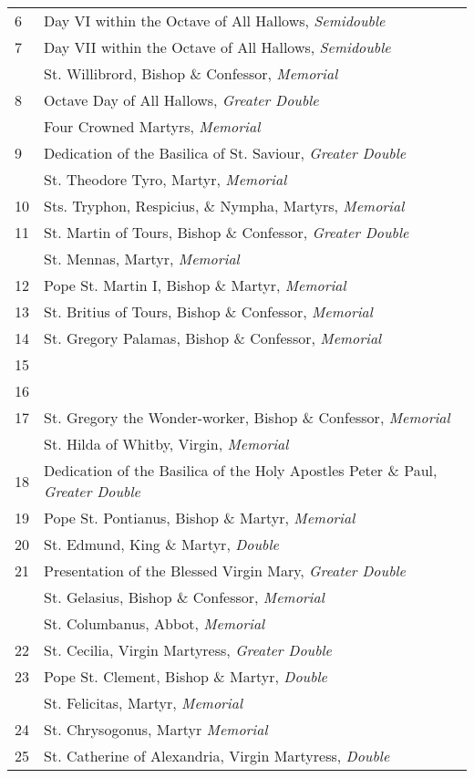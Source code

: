\begin{longtable}{p{2mm}|p{94mm}}
6&Day VI within the Octave of All Hallows, \textit{Semidouble}\\
7&Day VII within the Octave of All Hallows, \textit{Semidouble}\\
&St. Willibrord, Bishop \& Confessor, \textit{Memorial}\\
8&Octave Day of All Hallows, \textit{Greater Double}\\
&Four Crowned Martyrs, \textit{Memorial}\\
9&Dedication of the Basilica of St. Saviour, \textit{Greater Double}\\
&St. Theodore Tyro, Martyr, \textit{Memorial}\\
10&Sts. Tryphon, Respicius, \& Nympha, Martyrs, \textit{Memorial}\\
11&St. Martin of Tours, Bishop \& Confessor, \textit{Greater Double}\\
&St. Mennas, Martyr, \textit{Memorial}\\
12&Pope St. Martin I, Bishop \& Martyr, \textit{Memorial}\\
13&St. Britius of Tours, Bishop \& Confessor, \textit{Memorial}\\
14&St. Gregory Palamas, Bishop \& Confessor, \textit{Memorial}\\
15&\\
16&\\
17&St. Gregory the Wonder-worker, Bishop \& Confessor, \textit{Memorial}\\
&St. Hilda of Whitby, Virgin, \textit{Memorial}\\
18&Dedication of the Basilica of the Holy Apostles Peter \& Paul, \textit{Greater Double}\\
19&Pope St. Pontianus, Bishop \& Martyr, \textit{Memorial}\\
20&St. Edmund, King \& Martyr, \textit{Double}\\
21&Presentation of the Blessed Virgin Mary, \textit{Greater Double}\\
&St. Gelasius, Bishop \& Confessor, \textit{Memorial}\\
&St. Columbanus, Abbot, \textit{Memorial}\\
22&St. Cecilia, Virgin Martyress, \textit{Greater Double}\\
23&Pope St. Clement, Bishop \& Martyr, \textit{Double}\\
&St. Felicitas, Martyr, \textit{Memorial}\\
24&St. Chrysogonus, Martyr \textit{Memorial}\\
25&St. Catherine of Alexandria, Virgin Martyress, \textit{Double}\\

\end{longtable}
